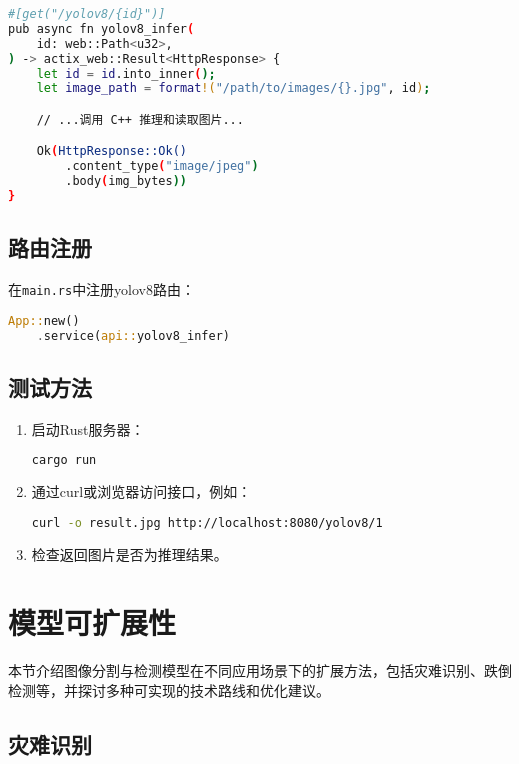 \begin{lstlisting}[language=bash, breaklines=true]
#[get("/yolov8/{id}")]
pub async fn yolov8_infer(
    id: web::Path<u32>,
) -> actix_web::Result<HttpResponse> {
    let id = id.into_inner();
    let image_path = format!("/path/to/images/{}.jpg", id);

    // ...调用 C++ 推理和读取图片...

    Ok(HttpResponse::Ok()
        .content_type("image/jpeg")
        .body(img_bytes))
}
\end{lstlisting}

\subsection{路由注册}

在\texttt{main.rs}中注册yolov8路由：

\begin{lstlisting}[language=Rust]
App::new()
    .service(api::yolov8_infer)
\end{lstlisting}

\subsection{测试方法}

\begin{enumerate}
    \item 启动Rust服务器：
    \begin{lstlisting}[language=bash]
cargo run
    \end{lstlisting}
    \item 通过curl或浏览器访问接口，例如：
    \begin{lstlisting}[language=bash]
curl -o result.jpg http://localhost:8080/yolov8/1
    \end{lstlisting}
    \item 检查返回图片是否为推理结果。
\end{enumerate}

\section{模型可扩展性}

本节介绍图像分割与检测模型在不同应用场景下的扩展方法，包括灾难识别、跌倒检测等，并探讨多种可实现的技术路线和优化建议。

\subsection{灾难识别}

